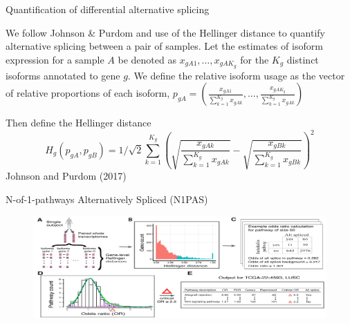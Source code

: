 \documentclass[ignorenonframetext,aspectratio=169,]{beamer}
\begin{document}
\begin{frame}{%
\protect\hypertarget{quantification-of-differential-alternative-splicing}{%
Quantification of differential alternative splicing}}

We follow Johnson \& Purdom and use of the Hellinger distance to
quantify alternative splicing between a pair of samples. Let the
estimates of isoform expression for a sample \(A\) be denoted as
\(x_{gA1},\ldots,x_{gAK_{g}}\) for the \(K_{g}\) distinct isoforms
annotated to gene \(g\). We define the relative isoform usage as the
vector of relative proportions of each isoform,
\(p_{gA}= \left( \frac{x_{gA1}}{\sum_{k=1}^{K_{g}} x_{gAk}}, \ldots, \frac{x_{gAK_{g}}}{\sum_{k=1}^{K_{g}} x_{gAk}} \right)\)

Then define the Hellinger distance \begin{equation*}
H_{g}(p_{gA}, p_{gB}) = 1 / \sqrt{2} \sum_{k=1}^{K_{g}} \left( \sqrt{ \frac{x_{gAk}}{\sum_{k=1}^{K_{g}} x_{gAk}}  }  - \sqrt{ \frac{x_{gBk}}{\sum_{k=1}^{K_{g}} x_{gBk}} } \right)^{2}
    \end{equation*} Johnson and Purdom (2017)

\end{frame}

\begin{frame}{%
\protect\hypertarget{n-of-1-pathways-alternatively-spliced-n1pas}{%
N-of-1-pathways Alternatively Spliced (N1PAS)}}

\begin{figure}[htb]
  \centering \includegraphics[keepaspectratio,width=\textwidth,height=0.8\textheight]{../n1pas/figures/Figure1.jpg}
\end{figure}

\end{frame}
\end{document}
